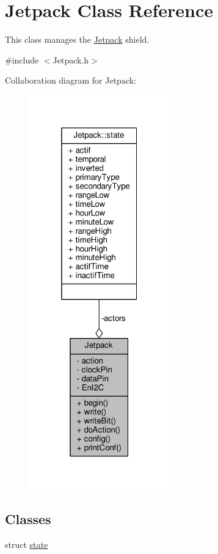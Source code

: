 \hypertarget{class_jetpack}{}\section{Jetpack Class Reference}
\label{class_jetpack}


This class manages the \hyperlink{class_jetpack}{Jetpack} shield.  




{\ttfamily \#include $<$Jetpack.\+h$>$}



Collaboration diagram for Jetpack\+:
\nopagebreak
\begin{figure}[H]
\begin{center}
\leavevmode
\includegraphics[width=172pt]{da/db7/class_jetpack__coll__graph}
\end{center}
\end{figure}
\subsection*{Classes}
\begin{DoxyCompactItemize}
\item 
struct \hyperlink{struct_jetpack_1_1state}{state}
\end{DoxyCompactItemize}
